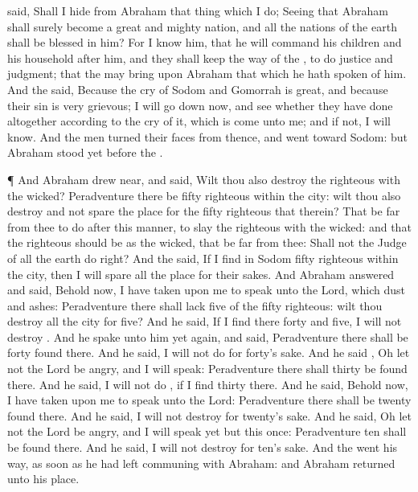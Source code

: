 {{}
said, Shall I
hide from
Abraham that thing
which I
do;
Seeing that
Abraham shall surely become a
great and
mighty
nation, and all the
nations of the
earth shall be
blessed in him?
For I
know him,
that he will
command his
children and his
household after
him, and they shall
keep the
way of the
{}, to
do
justice and
judgment; that the
{} may
bring upon
Abraham that which he hath
spoken of him.
And the
{}
said, Because the
cry of
Sodom and
Gomorrah is
great, and because their
sin is
very
grievous;
I will go
down now, and
see whether they have
done
altogether according to the
cry of it, which is
come unto me; and if not, I will
know.
And the
men turned their
faces from thence, and
went toward
Sodom: but
Abraham
stood
yet
before the
{}.
\par }{\PP {}¶ And
Abraham drew
near, and
said, Wilt thou also
destroy the
righteous
with the
wicked?
Peradventure there
be
fifty
righteous
within the
city: wilt thou also
destroy and not
spare the
place
for the
fifty
righteous that
{}
therein?
That be
far from thee to
do after this
manner, to
slay the
righteous with the
wicked: and that the
righteous should be as the
wicked, that be
far from thee: Shall not the
Judge of all the
earth
do
right?
And the
{}
said, If I
find in
Sodom
fifty
righteous
within the
city, then I will
spare all the
place for their sakes.
And
Abraham
answered and
said, Behold now, I have taken upon
me to
speak unto the
Lord,
which
{}
dust and
ashes:
Peradventure there shall
lack
five of the
fifty
righteous: wilt thou
destroy all the
city for
{}
five? And he
said, If I
find there
forty and
five, I will not
destroy
{}.
And he
spake unto him yet
again, and
said, Peradventure there shall be
forty
found there. And he
said, I will not
do
{} for
forty’s sake.
And he
said
{},
Oh let not the
Lord be
angry, and I will
speak: Peradventure there shall
thirty be
found there. And he
said, I will not
do
{}, if I
find
thirty there.
And he
said, Behold now, I have taken upon
me to
speak unto the
Lord: Peradventure there shall be
twenty
found there. And he
said, I will not
destroy
{} for
twenty’s sake.
And he
said, Oh let not the
Lord be
angry, and I will
speak
yet but this
once: Peradventure
ten shall be
found there. And he
said, I will not
destroy
{} for
ten’s sake.
And the
{} went his
way, as soon
as he had
left
communing with
Abraham: and
Abraham
returned unto his
place.

}
